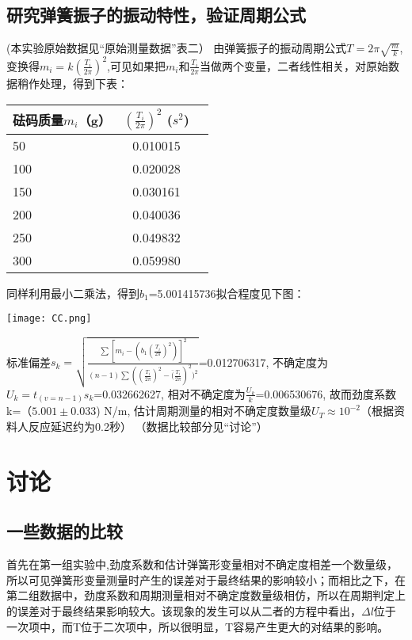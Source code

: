 \documentclass[UTF8]{ctexart}
\begin{document}
\subsection{研究弹簧振子的振动特性，验证周期公式}
(本实验原始数据见“原始测量数据”表二）
\newline
由弹簧振子的振动周期公式$T=2\pi\sqrt{\frac{m}{k}}$,变换得$m_i=k(\frac{T_i}{2\pi})^2$,可见如果把$m_i$和$\frac{T_i}{2\pi}$当做两个变量，二者线性相关，对原始数据稍作处理，得到下表：
\begin{table}[htbp!] 
\centering 
\begin{tabular}{|l|c|r|} 
\hline 
 砝码质量$m_i$（g） &  $(\frac{T_i}{2\pi})^2$   ($s^2$) \\ 
\hline 
 50 & 0.010015 \\ 
\hline 
 100 & 0.020028 \\ 
\hline 
 150 &  0.030161 \\ 
\hline 
 200 & 0.040036  \\ 
\hline 
 250 & 0.049832 \\ 
\hline 
 300 & 0.059980  \\ 
\hline
\end{tabular} 
\end{table}

同样利用最小二乘法，得到$b_1$=5.001415736拟合程度见下图：
\begin{center} 
\texttt{[image: CC.png]} 
\end{center}
标准偏差$s_k=\sqrt{\frac{\sum [m_i-(b_1(\frac{T_i}{2\pi})^2)]^2}{(n-1)\sum((\frac{T_i}{2\pi})^2-\bar(\frac{T_i}{2\pi})^2)^2}}$=0.012706317,
不确定度为$U_k=t_{(v=n-1)} s_k$=0.032662627,
相对不确定度为$\frac{U_k}{k}$=0.006530676,
故而劲度系数k=（$5.001\pm 0.033$) N/m,
估计周期测量的相对不确定度数量级$U_T\approx$$10^{-2}$（根据资料人反应延迟约为0.2秒）
\newline
（数据比较部分见“讨论”）

\section{讨论}
\subsection{一些数据的比较}
首先在第一组实验中,劲度系数和估计弹簧形变量相对不确定度相差一个数量级，所以可见弹簧形变量测量时产生的误差对于最终结果的影响较小；而相比之下，在第二组数据中，劲度系数和周期测量相对不确定度数量级相仿，所以在周期判定上的误差对于最终结果影响较大。该现象的发生可以从二者的方程中看出，$\Delta l$位于一次项中，而T位于二次项中，所以很明显，T容易产生更大的对结果的影响。
\end{document}
